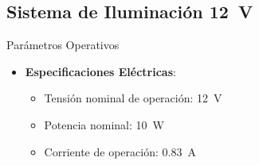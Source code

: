 \subsection{Sistema de Iluminación \SI{12}{\volt}}
\begin{componentBox}{Parámetros Operativos \citep{boylestad2013electronic}}
	\begin{itemize}[leftmargin=*,itemsep=1pt,parsep=1pt]
		\item \textbf{Especificaciones Eléctricas}:
		\begin{itemize}[itemsep=0pt,parsep=0pt]
			\item Tensión nominal de operación: \SI{12}{\volt}
			\item Potencia nominal: \SI{10}{\watt}
			\item Corriente de operación: \SI{0.83}{\ampere}
		\end{itemize}
	\end{itemize}
\end{componentBox}